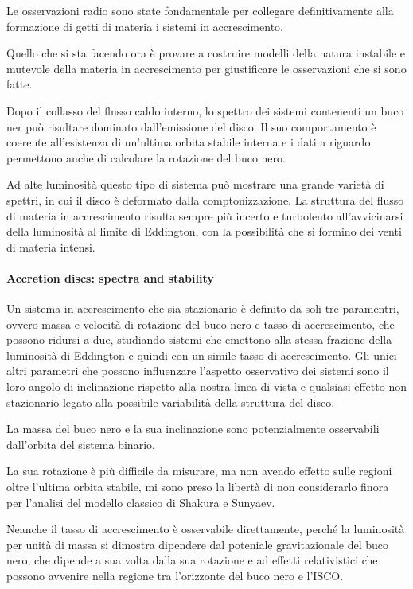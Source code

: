 \documentclass[a4paperbi]{article}
\begin{document}
	Le osservazioni radio sono state fondamentale per collegare definitivamente alla formazione di getti di materia i sistemi in accrescimento.
	
	Quello che si sta facendo ora è provare a costruire modelli della natura instabile e mutevole della materia in accrescimento per giustificare le osservazioni che si sono fatte.	
	
	Dopo il collasso del flusso caldo interno, lo spettro dei sistemi contenenti un buco ner può risultare dominato dall'emissione del disco. Il suo comportamento è coerente all'esistenza di un'ultima orbita stabile interna e i dati a riguardo permettono anche di calcolare la rotazione del buco nero.
	
	Ad alte luminosità questo tipo di sistema può mostrare una grande varietà di spettri, in cui il disco è deformato dalla comptonizzazione. La struttura del flusso di materia in accrescimento risulta sempre più incerto e turbolento all'avvicinarsi della luminosità al limite di Eddington, con la possibilità che si formino dei venti di materia intensi.
	
	\paragraph{Accretion discs: spectra and stability}
	Un sistema in accrescimento che sia stazionario è definito da soli tre paramentri, ovvero massa e velocità di rotazione del buco nero e tasso di accrescimento, che possono ridursi a due, studiando sistemi che emettono alla stessa frazione della luminosità di Eddington e quindi con un simile tasso di accrescimento. Gli unici altri parametri che possono influenzare l'aspetto osservativo dei sistemi sono il loro angolo di inclinazione rispetto alla nostra linea di vista e qualsiasi effetto non stazionario legato alla possibile variabilità della struttura del disco.
	
	La massa del buco nero e la sua inclinazione sono potenzialmente osservabili dall'orbita del sistema binario.
	
	La sua rotazione è più difficile da misurare, ma non avendo effetto sulle regioni oltre l'ultima orbita stabile, mi sono preso la libertà di non considerarlo finora per l'analisi del modello classico di Shakura e Sunyaev.
	
	Neanche il tasso di accrescimento è osservabile direttamente, perché la luminosità per unità di massa si dimostra dipendere dal poteniale gravitazionale del buco nero, che dipende a sua volta dalla sua rotazione e ad effetti relativistici che possono avvenire nella regione tra l'orizzonte del buco nero e l'ISCO.
	
\end{document}
